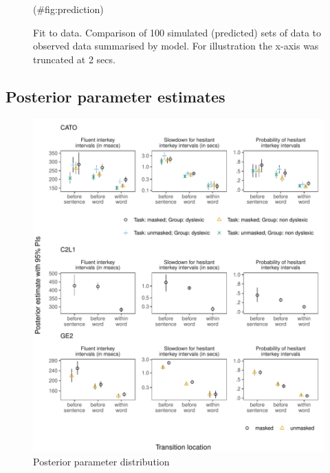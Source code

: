 \begin{appendix}
\begin{figure}
{}

\caption{Fit to data. Comparison of 100 simulated (predicted) sets of data to observed data summarised by model. For illustration the x-axis was truncated at 2 secs.}(\#fig:prediction)
\end{figure}

\newpage

\hypertarget{posterior-parameter-estimates}{%
\subsection{Posterior parameter
estimates}\label{posterior-parameter-estimates}}

\begin{figure}[!htb]
\centering
\includegraphics{figures/psplots1.pdf}
\caption{Posterior parameter distribution}
\end{figure}
\newpage
\begin{figure}[!htb]
\ContinuedFloat
\captionsetup{list=off,format=cont}
\centering

\end{figure}
\end{appendix}

